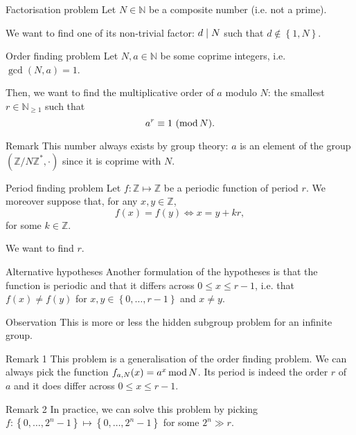 \documentclass[a4paper]{article}
\begin{document}
\begin{parag}{Factorisation problem}
    Let $N \in \mathbb{N}$ be a composite number (i.e. not a prime).

    We want to find one of its non-trivial factor: $d \mid N$ such that $d \not \in \left\{1, N\right\}$.
\end{parag}

\begin{parag}{Order finding problem}
    Let $N, a \in \mathbb{N}$ be some coprime integers, i.e. $\gcd\left(N, a\right) = 1$.

    Then, we want to find the multiplicative order of $a$ modulo $N$: the smallest $r \in \mathbb{N}_{\geq 1}$ such that 
    \[a^r \equiv 1\ (\operatorname{mod} N).\]

    \begin{subparag}{Remark}
        This number always exists by group theory: $a$ is an element of the group $\left(\mathbb{Z}/N\mathbb{Z}^*, \cdot \right)$ since it is coprime with $N$.
    \end{subparag}
\end{parag}

\begin{parag}{Period finding problem}
    Let $f: \mathbb{Z} \mapsto \mathbb{Z}$ be a periodic function of period $r$. We moreover suppose that, for any $x, y \in \mathbb{Z}$,
    \[f\left(x\right) = f\left(y\right) \iff x = y + kr,\]
    for some $k \in \mathbb{Z}$. 

    We want to find $r$.

    \begin{subparag}{Alternative hypotheses}
        Another formulation of the hypotheses is that the function is periodic and that it differs across $0 \leq x \leq r- 1$, i.e. that $f\left(x\right) \neq f\left(y\right)$ for $x, y \in \left\{0, \ldots, r-1\right\}$ and $x \neq y$.
    \end{subparag}

    \begin{subparag}{Observation}
        This is more or less the hidden subgroup problem for an infinite group.
    \end{subparag}

    \begin{subparag}{Remark 1}
        This problem is a generalisation of the order finding problem. We can always pick the function $f_{a, N}\left(x\right) = a^x \Mod N$. Its period is indeed the order $r$ of $a$ and it does differ across $0 \leq x \leq r-1$.
    \end{subparag}

    \begin{subparag}{Remark 2}
        In practice, we can solve this problem by picking $f: \left\{0, \ldots, 2^n - 1\right\} \mapsto \left\{0, \ldots, 2^n - 1\right\}$ for some $2^n \gg r$.
    \end{subparag}
\end{parag}
\end{document}
